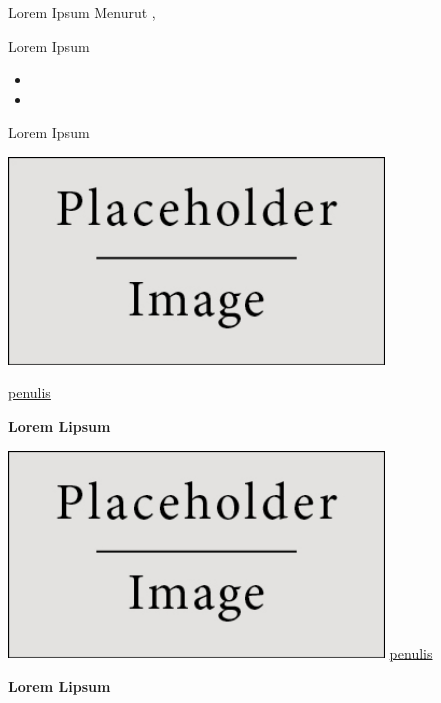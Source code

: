 \documentclass{beamer}
\begin{document}
\begin{frame}{Lorem Ipsum}
Menurut \cite{setyowati2013}, \lipsum[1-1]
%
\end{frame}

\begin{frame}{Lorem Ipsum}
\vspace{4pt}
	\begin{itemize}
\item \lipsum[10][1-2]
\item \lipsum[1][1-2]
	\end{itemize}

\end{frame}



\begin{frame}{Lorem Ipsum}
	\begin{center}
		\includegraphics[height=5.5cm]{figures/placeholder}

		{\tiny \textcolor{digiPH_darkorange}{\lipsum[1][1] \url{penulis}}}
	\end{center}
	\begin{center}
		\textbf{Lorem Lipsum} \lipsum[1][1]

	\end{center}
\end{frame}

\begin{frame}
	\begin{center}
		\includegraphics[height=5.5cm]{figures/placeholder}
		{\tiny \textcolor{digiPH_darkorange}{\lipsum[1][1] \url{penulis}}}
	\end{center}
	\begin{center}
		{\small\textbf{Lorem Lipsum} \lipsum[1][1]}
	\end{center}
\end{frame}
\end{document}
